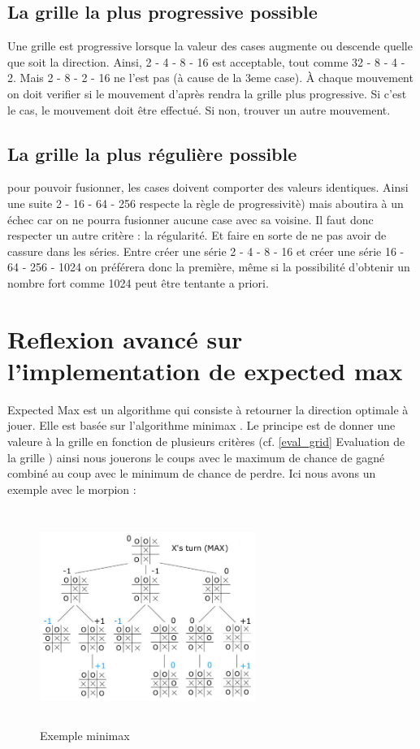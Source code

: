 \documentclass{article}
\begin{document}
	\subsection{La grille la plus progressive possible}
	Une grille est progressive lorsque la valeur des cases augmente ou descende quelle que soit la direction. Ainsi, 2 - 4 - 8 - 16 est acceptable, tout comme 32 - 8 - 4 - 2. Mais 2 - 8 - 2 - 16 ne l'est pas (\`a cause de la 3eme case). \`A chaque mouvement on doit verifier si  le mouvement d'apr\`es rendra la grille plus progressive. Si c'est le cas, le mouvement doit \^etre effectu\'e. Si non, trouver un autre mouvement.

	\subsection{La grille la plus réguli\`ere possible}
	pour pouvoir fusionner, les cases doivent comporter des valeurs identiques. Ainsi une suite 2 - 16 - 64 - 256 respecte la r\`egle de progressivit\`e) mais aboutira à un \'echec car on ne pourra fusionner aucune case avec sa voisine. Il faut donc respecter un autre crit\`ere : la r\'egularit\'e. Et faire en sorte de ne pas avoir de cassure dans les s\'eries. Entre cr\'eer une série 2 - 4 - 8 - 16 et cr\'eer une s\'erie 16 - 64 - 256 - 1024 on pr\'ef\'erera donc la premi\`ere, m\^eme si la possibilit\'e d'obtenir un nombre fort comme 1024 peut \^etre tentante a priori.

\clearpage
\section{Reflexion avanc\'e sur l'implementation de expected max}
\og Expected Max \fg{} est un algorithme qui consiste \`a retourner la direction optimale \`a jouer. Elle est bas\'ee sur l'algorithme \og minimax \fg{}. Le principe est de donner une valeure à la grille en fonction de plusieurs critères (cf. \og \ref{eval_grid} Evaluation de la grille \fg{}) ainsi nous jouerons le coups avec le maximum de chance de gagné combiné au coup avec le minimum de chance de perdre. Ici nous avons un exemple avec le morpion :

\begin{figure}[!h]
   \includegraphics[width=7cm,height=7cm]{minimax.jpg}
   \caption{\label{minimax} Exemple minimax}
\end{figure}
\end{document}
